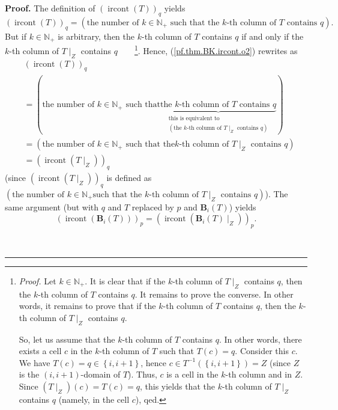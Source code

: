 \documentclass[numbers=enddot,12pt,final,onecolumn,notitlepage]{scrartcl}%
\theoremstyle{definition}
\newenvironment{proof}[1][Proof]{\noindent\textbf{#1.} }{\ \rule{0.5em}{0.5em}}
\newenvironment{verlong}{}{}
\begin{document}
\begin{verlong}
\begin{proof}
The definition of $\left(  \operatorname*{ircont}\left(  T\right)  \right)
_{q}$ yields%
\begin{equation}
\left(  \operatorname*{ircont}\left(  T\right)  \right)  _{q}=\left(
\text{the number of }k\in\mathbb{N}_{+}\text{ such that the }k\text{-th column
of }T\text{ contains }q\right)  . \label{pf.thm.BK.ircont.o2}%
\end{equation}
But if $k\in\mathbb{N}_{+}$ is arbitrary, then the $k$-th column of $T$
contains $q$ if and only if the $k$-th column of $T\mid_{Z}$ contains
$q$\ \ \ \ \footnote{\textit{Proof.} Let $k\in\mathbb{N}_{+}$. It is clear
that if the $k$-th column of $T\mid_{Z}$ contains $q$, then the $k$-th column
of $T$ contains $q$. It remains to prove the converse. In other words, it
remains to prove that if the $k$-th column of $T$ contains $q$, then the
$k$-th column of $T\mid_{Z}$ contains $q$.
\par
So, let us assume that the $k$-th column of $T$ contains $q$. In other words,
there exists a cell $c$ in the $k$-th column of $T$ such that $T\left(
c\right)  =q$. Consider this $c$. We have $T\left(  c\right)  =q\in\left\{
i,i+1\right\}  $, hence $c\in T^{-1}\left(  \left\{  i,i+1\right\}  \right)
=Z$ (since $Z$ is the $\left(  i,i+1\right)  $-domain of $T$). Thus, $c$ is a
cell in the $k$-th column and in $Z$. Since $\left(  T\mid_{Z}\right)  \left(
c\right)  =T\left(  c\right)  =q$, this yields that the $k$-th column of
$T\mid_{Z}$ contains $q$ (namely, in the cell $c$), qed.}. Hence,
(\ref{pf.thm.BK.ircont.o2}) rewrites as%
\begin{align}
&  \left(  \operatorname*{ircont}\left(  T\right)  \right)  _{q}\nonumber\\
&  =\left(  \text{the number of }k\in\mathbb{N}_{+}\text{ such that
}\underbrace{\text{the }k\text{-th column of }T\text{ contains }%
q}_{\substack{\text{this is equivalent to}\\\left(  \text{the }k\text{-th
column of }T\mid_{Z}\text{ contains }q\right)  }}\right) \nonumber\\
&  =\left(  \text{the number of }k\in\mathbb{N}_{+}\text{ such that the
}k\text{-th column of }T\mid_{Z}\text{ contains }q\right) \nonumber\\
&  =\left(  \operatorname*{ircont}\left(  T\mid_{Z}\right)  \right)  _{q}
\label{pf.thm.BK.ircont.o4a}%
\end{align}
(since $\left(  \operatorname*{ircont}\left(  T\mid_{Z}\right)  \right)  _{q}$
is defined as \newline$\left(  \text{the number of }k\in\mathbb{N}_{+}\text{
such that the }k\text{-th column of }T\mid_{Z}\text{ contains }q\right)  $).
The same argument (but with $q$ and $T$ replaced by $p$ and $\mathbf{B}%
_{i}\left(  T\right)  $) yields%
\[
\left(  \operatorname*{ircont}\left(  \mathbf{B}_{i}\left(  T\right)  \right)
\right)  _{p}=\left(  \operatorname*{ircont}\left(  \mathbf{B}_{i}\left(
T\right)  \mid_{Z}\right)  \right)  _{p}.
\]



\end{proof}
\end{verlong}
\end{document}
